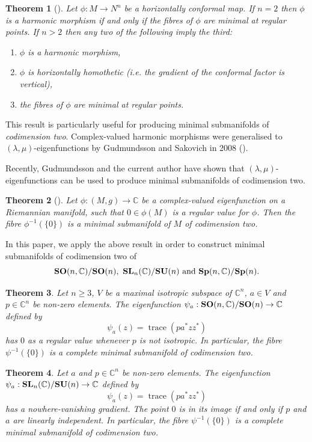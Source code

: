 \documentclass[11pt,reqno]{amsart}
\theoremstyle{plain}
\newtheorem{theorem}                 {Theorem}[section]
\theoremstyle{definition}
\numberwithin{equation}{section}
\def \cn{{\mathbb C}}
\def \SLC#1{\text{\bf SL}_{#1}(\cn)}
\def \SO#1{\text{\bf SO}(#1)}
\def \SOC#1{\text{\bf SO}(#1,\cn)}
\def \SU#1{\text{\bf SU}(#1)}
\def \Sp#1{\text{\bf Sp}(#1)}
\def \SpC#1{\text{\bf Sp}(#1,\cn)}
\DeclareMathOperator{\trace}{trace}
\numberwithin{equation}{section}
\begin{document}
\begin{theorem}[\cite{Bai-Eel}]
	Let $\phi: M \to N^n$ be a horizontally conformal map. 
	If $n=2$ then $\phi$ is a harmonic morphism if and only if the fibres of $\phi$ are minimal at regular points. If $n > 2$ then any two of the following imply the third:
	\begin{enumerate}
		\item $\phi$ is a harmonic morphism,
		\item $\phi$ is horizontally homothetic (i.e. the gradient of the conformal factor is vertical),
		\item the fibres of $\phi$ are minimal at regular points.
	\end{enumerate}
\end{theorem}
This result is particularly useful for producing minimal submanifolds of {\it codimension two}. Complex-valued harmonic morphisms were generalised to $(\lambda,\mu)$-eigenfunctions by Gudmundsson and Sakovich in 2008 (\cite{Gud-Sak-1}).

Recently, Gudmundsson and the current author have shown that $(\lambda,\mu)$-eigenfunctions  can be used to produce minimal submanifolds of codimension two.
\begin{theorem}[\cite{Gud-Mun-1}] \label{Gud-Mun-1-Thm}
Let $\phi:(M,g)\to\cn$ be a complex-valued eigenfunction on a Riemannian manifold, such that $0\in\phi(M)$ is a regular value for $\phi$.  Then the fibre $\phi^{-1}(\{0\})$ is a minimal submanifold of $M$ of codimension two.
\end{theorem}

\smallskip 

In this paper, we apply the above result in order to construct minimal submanifolds of codimension two of
 $$\SOC n/\SO n, \ \SLC n/\SU n \text{ and } \SpC n/\Sp n.$$


\begin{theorem}\label{thm-so-minimal}
Let $n \geq 3$, $V$ be a maximal isotropic subspace of $\cn^n$, $a \in V$ and $p \in \cn^n$ be non-zero elements. 
The eigenfunction  $\psi_a : \SOC{n}/\SO n \to \cn$ defined by $$ \psi_a(z) = \trace (p a^*{z} z^{*})$$ has $0$ as a regular value whenever $p$ is not isotropic. In particular, the fibre $\psi^{-1}(\{0\})$ is a complete minimal submanifold of codimension two.
\end{theorem}

\begin{theorem}\label{thm-slc-minimal}
	Let $a$ and $p \in \cn^n$ be non-zero elements. The eigenfunction  $\psi_a  : \SLC{n}/\SU{n} \to \cn $ defined by $$ \psi_a(z)=\trace (p a^* {z} z^{*})$$ has a nowhere-vanishing gradient. The point $0$ is in its image if and only if $p$ and $a$ are linearly independent. In particular, the fibre $\psi^{-1}(\{0\})$ is a complete minimal submanifold of codimension two.
\end{theorem}
\end{document}

